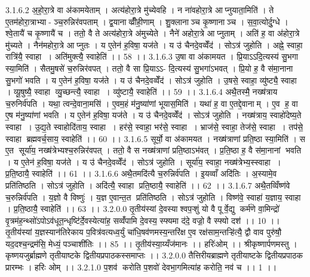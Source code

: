 3.1.6.2
अ॒हो॒रा॒त्रे वा अ॑कामयेताम् । अत्य॑होरा॒त्रे मु॑च्येवहि । न ना॑वहोरा॒त्रे आप्नुयाता॒मिति॑ । ते ए॒तम॑होरा॒त्राभ्या- ञ्च॒रुन्निर॑वपताम् । द्व॒यानाव्व्रीँही॒णाम् । शु॒क्लानाञ्च कृ॒ष्णानाञ्च । स॒वा॒त्योर्दु॒ग्धे । श्वे॒तायै॑ च कृ॒ष्णायै॑ च । ततो॒ वै ते अत्य॑होरा॒त्रे अ॑मुच्येते । नैने॑ अहोरा॒त्रे आप्नुताम् । अति॑ ह॒ वा अ॑होरा॒त्रे मु॑च्यते । नैन॑महोरा॒त्रे आप्नुतः । य ए॒तेन॑ ह॒विषा॒ यज॑ते । य उ॑ चैनदे॒वव्वेँद॑ । सोऽत्र॑ जुहोति । अह्ने॒ स्वाहा॒ रात्रि॑यै॒ स्वाहा । अति॑मुक्त्यै॒ स्वाहेति॑ ।। 58 ।।
3.1.6.3
उ॒षा वा अ॑कामयत । प्रि॒याऽऽदि॒त्यस्य॑ सु॒भगा स्या॒मिति॑ । सैतमु॒षसे॑ च॒रुन्निर॑वपत् । ततो॒ वै सा प्रि॒याऽऽ- दि॒त्यस्य॑ सु॒भगा॑ऽभवत् । प्रि॒यो ह॒ वै स॑मा॒नाना॑ सु॒भगो॑ भवति । य ए॒तेन॑ ह॒विषा॒ यज॑ते । य उ॑ चैनदे॒वव्वेँद॑ । सोऽत्र॑ जुहोति । उ॒षसे॒ स्वाहा॒ व्यु॑ष्ट्यै॒ स्वाहा । व्यू॒षुष्यै॒ स्वाहा व्यु॒च्छन्त्यै॒ स्वाहा । व्यु॑ष्टायै॒ स्वाहेति॑ ।। 59 ।।
3.1.6.4
अथै॒तस्मै॒ नख्ष॑त्राय च॒रुनिर्व॑पति । यथा॒ त्वन्दे॒वाना॒मसि॑ । ए॒वम॒हं म॑नु॒ष्या॑णां भूयास॒मिति॑ । यथा॑ ह॒ वा ए॒तद्दे॒वानाम् । ए॒व ह॒ वा ए॒ष म॑नु॒ष्या॑णां भवति । य ए॒तेन॑ ह॒विषा॒ यज॑ते । य उ॑ चैनदे॒वव्वेँद॑ । सोऽत्र॑ जुहोति । नख्ष॑त्राय॒ स्वाहो॑देष्य॒ते स्वाहा । उ॒द्य॒ते स्वाहोदि॑ताय॒ स्वाहा । हर॑से॒ स्वाहा॒ भर॑से॒ स्वाहा । भ्राज॑से॒ स्वाहा॒ तेज॑से॒ स्वाहा । तप॑से॒ स्वाहा ब्रह्मवर्च॒साय॒ स्वाहेति॑ ।। 60 ।।
3.1.6.5
सूर्यो॒ वा अ॑कामयत । नख्ष॑त्राणां प्रति॒ष्ठा स्या॒मिति॑ । स ए॒त सूर्या॑य॒ नख्ष॑त्रेभ्यश्च॒रुन्निर॑वपत् । ततो॒ वै स नख्ष॑त्राणां प्रति॒ष्ठाऽभ॑वत् । प्र॒ति॒ष्ठा ह॒ वै स॑मा॒नानां भवति । य ए॒तेन॑ ह॒विषा॒ यज॑ते । य उ॑ चैनदे॒वव्वेँद॑ । सोऽत्र॑ जुहोति । सूर्या॑य॒ स्वाहा॒ नख्ष॑त्रेभ्य॒स्स्वाहा । प्र॒ति॒ष्ठायै॒ स्वाहेति॑ ।। 61 ।।
3.1.6.6
अथै॒तमदि॑त्यै च॒रुन्निर्व॑पति । इ॒यव्वाँ अदि॑तिः । अ॒स्यामे॒व प्रति॑तिष्ठति । सोऽत्र॑ जुहोति । अदि॑त्यै॒ स्वाहा प्रति॒ष्ठायै॒ स्वाहेति॑ ।। 62 ।।
3.1.6.7
अथै॒तव्विँष्ण॑वे च॒रुन्निर्व॑पति । य॒ज्ञो वै विष्णुः॑ । य॒ज्ञ ए॒वान्त॒त प्रति॑तिष्ठति । सोऽत्र॑ जुहोति । विष्ण॑वे॒ स्वाहा॑ य॒ज्ञाय॒ स्वाहा । प्र॒ति॒ष्ठायै॒ स्वाहेति॑ ।। 63 ।।
3.2.0.0
तृ॒तीय॑स्यां दे॒वस्याश्वप॒ऱ्शुं यो वै पूर्वे॒द्यु कर्म॑णे वा॒मिन्द्रो॑ वृ॒त्रम॑ह॒न्थ्सो॑ऽपोऽव॑धूत॒न्धृष्टि॑र्दे॒वस्येत्या॑ह॒ सव्वँ॑पामि दे॒वस्य॒ स्फ्यमा द॑दे॒ वज्रो॒ वै स्फ्यो दश॑ ।। 10 ।। तृ॒तीय॑स्यां य॒ज्ञस्यान॑तिरेकाय प॒वित्र॑वत्यध्व॒र्युं चा॑धि॒षव॑णमस्य॒न्तरि॑क्ष ए॒व रक्ष॑साम॒न्तऱ्हि॑त्यै॒ द्वौ वाव पुरु॑षौ॒ यद॒दश्च॒न्द्रम॑सि॒ मेध्यं॒ पञ्चाशी॑तिः ।। 85 ।। तृ॒तीय॑स्या॒य्यँज॑मानः ।। हरिः॑ओम् ।। श्रीकृष्णार्पणमस्तु । कृष्णयजुर्ब्राह्मणे तृतीयाष्टके द्वितीयप्रपाठकस्समाप्तः ।।
3.2.0.0
तैत्तिरीयब्राह्मणे तृतीयाष्टके द्वितीयप्रपाठक प्रारम्भः । हरिः ओम् ।।
3.2.1.0
प॒शव॑ करोति प॒शवो॑ देवभा॒गमित्या॑ह करोति॒ नव॑ च ।। 1 ।।
